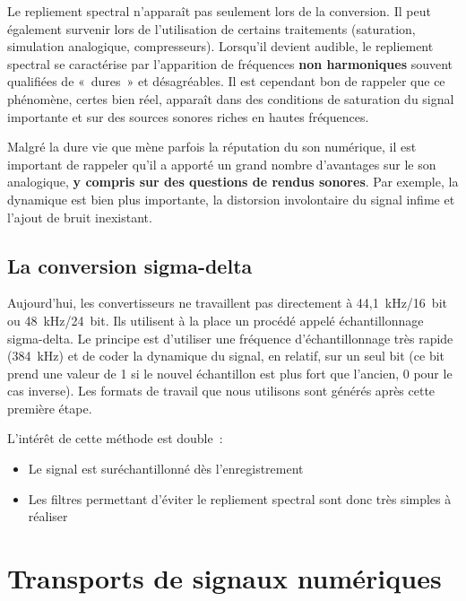 \documentclass[
  letterpaper,
  DIV=11,
  numbers=noendperiod]{scrreprt}
\providecommand{\tightlist}{%
  \setlength{\itemsep}{0pt}\setlength{\parskip}{0pt}}\usepackage{longtable,booktabs,array}
\begin{document}
Le repliement spectral n'apparaît pas seulement lors de la conversion.
Il peut également survenir lors de l'utilisation de certains traitements
(saturation, simulation analogique, compresseurs). Lorsqu'il devient
audible, le repliement spectral se caractérise par l'apparition de
fréquences \textbf{non harmoniques} souvent qualifiées de «~dures~» et
désagréables. Il est cependant bon de rappeler que ce phénomène, certes
bien réel, apparaît dans des conditions de saturation du signal
importante et sur des sources sonores riches en hautes fréquences.

Malgré la dure vie que mène parfois la réputation du son numérique, il
est important de rappeler qu'il a apporté un grand nombre d'avantages
sur le son analogique, \textbf{y compris sur des questions de rendus
sonores}. Par exemple, la dynamique est bien plus importante, la
distorsion involontaire du signal infime et l'ajout de bruit inexistant.

\hypertarget{la-conversion-sigma-delta}{%
\section{La conversion sigma-delta}\label{la-conversion-sigma-delta}}

Aujourd'hui, les convertisseurs ne travaillent pas directement à
44,1~kHz/16~bit ou 48~kHz/24~bit. Ils utilisent à la place un procédé
appelé échantillonnage sigma-delta. Le principe est d'utiliser une
fréquence d'échantillonnage très rapide (384~kHz) et de coder la
dynamique du signal, en relatif, sur un seul bit (ce bit prend une
valeur de 1 si le nouvel échantillon est plus fort que l'ancien, 0 pour
le cas inverse). Les formats de travail que nous utilisons sont générés
après cette première étape.

L'intérêt de cette méthode est double~:

\begin{itemize}
\tightlist
\item
  Le signal est suréchantillonné dès l'enregistrement
\item
  Les filtres permettant d'éviter le repliement spectral sont donc très
  simples à réaliser
\end{itemize}

\hypertarget{transports-de-signaux-numuxe9riques}{%
\chapter{Transports de signaux
numériques}\label{transports-de-signaux-numuxe9riques}}
\end{document}
